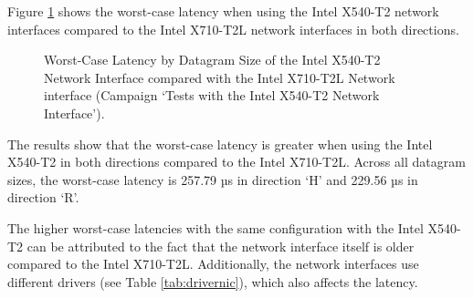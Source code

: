 Figure \ref{fig:540Wc} shows the worst-case latency when using the Intel X540-T2 network interfaces compared to the Intel X710-T2L network interfaces in both directions.

\begin{figure}[h!]
  \centering
  \vspace{10pt}
  \caption{Worst-Case Latency by Datagram Size of the Intel X540-T2 Network Interface compared with the Intel X710-T2L Network interface (Campaign `Tests with the Intel X540-T2 Network Interface').}
  \label{fig:540Wc}
\end{figure}

The results show that the worst-case latency is greater when using the Intel X540-T2 in both directions compared to the Intel X710-T2L. Across all datagram sizes, the worst-case latency is 257.79 µs in direction `H' and 229.56 µs in direction `R'.

The higher worst-case latencies with the same configuration with the Intel X540-T2 can be attributed to the fact that the network interface itself is older compared to the Intel X710-T2L. Additionally, the network interfaces use different drivers (see Table \ref{tab:drivernic}), which also affects the latency.

